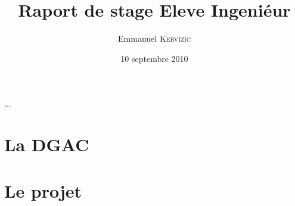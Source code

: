 

\date{10 septembre 2010}
\title{Raport de stage Eleve Ingeniéur}
\author{Emmanuel \textsc{Kervizic}}



\maketitle

\tableofcontents

 ...
\chapter{La DGAC}



\chapter{Le projet}





\appendix


%
%





